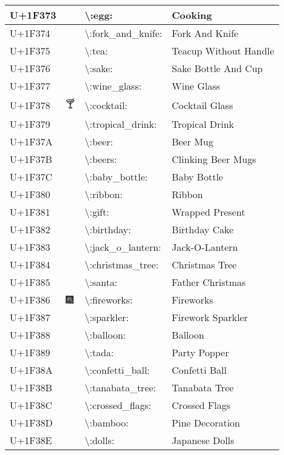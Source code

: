 \begin{table}[h]
\begin{tabulary}{\linewidth}{|L|L|L|L|}
\hline
U+1F373 & 🍳 & {\textbackslash}:egg: & Cooking \\
\hline
U+1F374 & 🍴 & {\textbackslash}:fork\_and\_knife: & Fork And Knife \\
\hline
U+1F375 & 🍵 & {\textbackslash}:tea: & Teacup Without Handle \\
\hline
U+1F376 & 🍶 & {\textbackslash}:sake: & Sake Bottle And Cup \\
\hline
U+1F377 & 🍷 & {\textbackslash}:wine\_glass: & Wine Glass \\
\hline
U+1F378 & 🍸 & {\textbackslash}:cocktail: & Cocktail Glass \\
\hline
U+1F379 & 🍹 & {\textbackslash}:tropical\_drink: & Tropical Drink \\
\hline
U+1F37A & 🍺 & {\textbackslash}:beer: & Beer Mug \\
\hline
U+1F37B & 🍻 & {\textbackslash}:beers: & Clinking Beer Mugs \\
\hline
U+1F37C & 🍼 & {\textbackslash}:baby\_bottle: & Baby Bottle \\
\hline
U+1F380 & 🎀 & {\textbackslash}:ribbon: & Ribbon \\
\hline
U+1F381 & 🎁 & {\textbackslash}:gift: & Wrapped Present \\
\hline
U+1F382 & 🎂 & {\textbackslash}:birthday: & Birthday Cake \\
\hline
U+1F383 & 🎃 & {\textbackslash}:jack\_o\_lantern: & Jack-O-Lantern \\
\hline
U+1F384 & 🎄 & {\textbackslash}:christmas\_tree: & Christmas Tree \\
\hline
U+1F385 & 🎅 & {\textbackslash}:santa: & Father Christmas \\
\hline
U+1F386 & 🎆 & {\textbackslash}:fireworks: & Fireworks \\
\hline
U+1F387 & 🎇 & {\textbackslash}:sparkler: & Firework Sparkler \\
\hline
U+1F388 & 🎈 & {\textbackslash}:balloon: & Balloon \\
\hline
U+1F389 & 🎉 & {\textbackslash}:tada: & Party Popper \\
\hline
U+1F38A & 🎊 & {\textbackslash}:confetti\_ball: & Confetti Ball \\
\hline
U+1F38B & 🎋 & {\textbackslash}:tanabata\_tree: & Tanabata Tree \\
\hline
U+1F38C & 🎌 & {\textbackslash}:crossed\_flags: & Crossed Flags \\
\hline
U+1F38D & 🎍 & {\textbackslash}:bamboo: & Pine Decoration \\
\hline
U+1F38E & 🎎 & {\textbackslash}:dolls: & Japanese Dolls \\

\end{tabulary}
\end{table}
